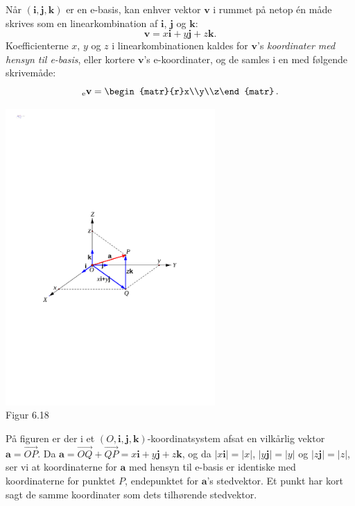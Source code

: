 \begin{theorem}
Når $(\mathbf i,\mathbf j,\mathbf k)$ er en e-basis, kan enhver vektor $\mathbf v$ i rummet på netop én måde skrives som en linearkombination af $\mathbf i$, $\mathbf j$ og $\mathbf k$:
$$\mathbf v=x\mathbf i+y\mathbf j +z\mathbf k.$$
Koefficienterne $x$, $y$ og $z$ i linearkombinationen kaldes for $\mathbf v$'s \textit{koordinater med hensyn til e-basis}, eller kortere $\mathbf v$'s e-koordinater, og de samles i en  med følgende skrivemåde:
$$_\mathrm e\mathbf v=
\begin{matr}{r}x\\y\\z\end{matr}\,.$$
\end{theorem}

\begin{remark}
\begin{center}
		\includegraphics[trim=3cm 10cm 3cm 10cm,width=0.60\textwidth,clip]{geometer/vektor12.pdf}				
		\\Figur 6.18
\end{center}
På figuren er der i et $(O,\mathbf i,\mathbf j,\mathbf k)$-koordinatsystem afsat en vilkårlig vektor $\mathbf a =\stackrel{\rightarrow}{OP}$. Da $\mathbf a = \stackrel{\rightarrow}{OQ}+\stackrel{\rightarrow}{QP}=x\mathbf i + y\mathbf j+z\mathbf k$, og da $|x\mathbf i|=|x|$, $|y\mathbf j|=|y|$ og $|z\mathbf j|=|z|$, ser vi at koordinaterne for $\mathbf a$ med hensyn til e-basis er identiske med koordinaterne for punktet $P$, endepunktet for $\mathbf a$'s stedvektor. Et punkt har kort sagt de samme koordinater som dets tilhørende stedvektor.
\end{remark}
